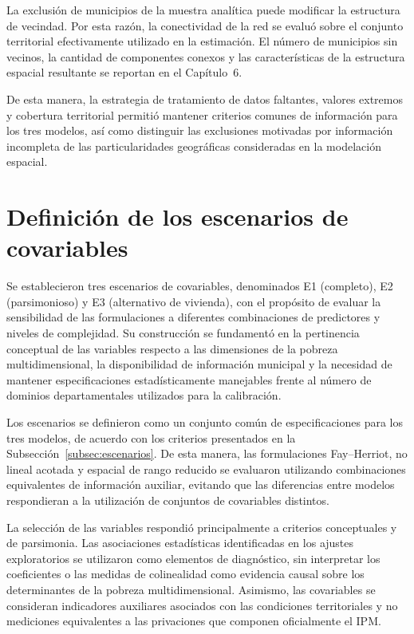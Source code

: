La exclusión de municipios de la muestra analítica puede modificar la estructura de vecindad. Por esta razón, la conectividad de la red se evaluó sobre el conjunto territorial efectivamente utilizado en la estimación. El número de municipios sin vecinos, la cantidad de componentes conexos y las características de la estructura espacial resultante se reportan en el Capítulo~6.

De esta manera, la estrategia de tratamiento de datos faltantes, valores extremos y cobertura territorial permitió mantener criterios comunes de información para los tres modelos, así como distinguir las exclusiones motivadas por información incompleta de las particularidades geográficas consideradas en la modelación espacial.



\section{Definición de los escenarios de covariables}
\label{sec:met-escenarios}

Se establecieron tres escenarios de covariables, denominados E1 (completo), E2 (parsimonioso) y E3 (alternativo de vivienda), con el propósito de evaluar la sensibilidad de las formulaciones a diferentes combinaciones de predictores y niveles de complejidad. Su construcción se fundamentó en la pertinencia conceptual de las variables respecto a las dimensiones de la pobreza multidimensional, la disponibilidad de información municipal y la necesidad de mantener especificaciones estadísticamente manejables frente al número de dominios departamentales utilizados para la calibración.

Los escenarios se definieron como un conjunto común de especificaciones para los tres modelos, de acuerdo con los criterios presentados en la Subsección~\ref{subsec:escenarios}. De esta manera, las formulaciones Fay--Herriot, no lineal acotada y espacial de rango reducido se evaluaron utilizando combinaciones equivalentes de información auxiliar, evitando que las diferencias entre modelos respondieran a la utilización de conjuntos de covariables distintos.

La selección de las variables respondió principalmente a criterios conceptuales y de parsimonia. Las asociaciones estadísticas identificadas en los ajustes exploratorios se utilizaron como elementos de diagnóstico, sin interpretar los coeficientes o las medidas de colinealidad como evidencia causal sobre los determinantes de la pobreza multidimensional. Asimismo, las covariables se consideran indicadores auxiliares asociados con las condiciones territoriales y no mediciones equivalentes a las privaciones que componen oficialmente el IPM.

